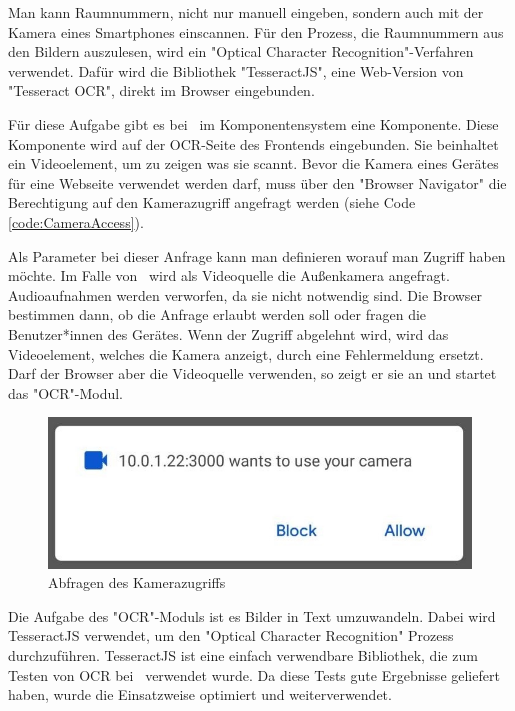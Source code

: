 
\label{sec:ocrmodul}

Man kann Raumnummern, nicht nur manuell eingeben, sondern auch mit der Kamera eines Smartphones einscannen. Für den Prozess, die Raumnummern aus den Bildern auszulesen, wird ein "Optical Character Recognition"-Verfahren verwendet. Dafür wird die Bibliothek "TesseractJS", eine Web-Version von "Tesseract OCR", direkt im Browser eingebunden.\cite{TesseractJS}\cite{TesseractJSImplementation}

Für diese Aufgabe gibt es bei \ZELIA\ im Komponentensystem eine Komponente. Diese Komponente wird auf der OCR-Seite des Frontends eingebunden. Sie beinhaltet ein Videoelement, um zu zeigen was sie scannt. Bevor die Kamera eines Gerätes für eine Webseite verwendet werden darf, muss über den "Browser Navigator" die Berechtigung auf den Kamerazugriff angefragt werden (siehe Code \ref{code:CameraAccess}).


Als Parameter bei dieser Anfrage kann man definieren worauf man Zugriff haben möchte. Im Falle von \ZELIA\ wird als Videoquelle die Außenkamera angefragt. Audioaufnahmen werden verworfen, da sie nicht notwendig sind. Die Browser bestimmen dann, ob die Anfrage erlaubt werden soll oder fragen die Benutzer*innen des Gerätes. Wenn der Zugriff abgelehnt wird, wird das Videoelement, welches die Kamera anzeigt, durch eine Fehlermeldung ersetzt. Darf der Browser aber die Videoquelle verwenden, so zeigt er sie an und startet das "OCR"-Modul.

\begin{figure}[H]
    \centering
    \includegraphics[width=120mm]{media/OCR/cam_access_light.jpg}
    \caption{Abfragen des Kamerazugriffs}
\end{figure}


Die Aufgabe des "OCR"-Moduls ist es Bilder in Text umzuwandeln. Dabei wird TesseractJS verwendet, um den "Optical Character Recognition" Prozess durchzuführen. TesseractJS ist eine einfach verwendbare Bibliothek, die zum Testen von OCR bei \ZELIA\ verwendet wurde. Da diese Tests gute Ergebnisse geliefert haben, wurde die Einsatzweise optimiert und weiterverwendet.

